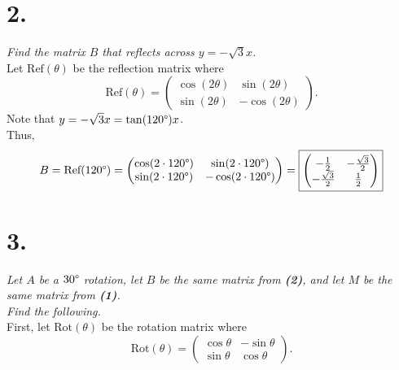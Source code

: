 \documentclass[12pt]{article}
\begin{document}
\section*{2.}
\textit{Find the matrix $B$ that reflects across $y = -\sqrt{3}x$.}
\\[\baselineskip]
Let $\text{Ref}(\theta)$ be the reflection matrix where
\begin{equation*}
	\text{Ref}(\theta) =
	\begin{pmatrix}
		\cos(2 \theta) & \sin(2 \theta) \\
		\sin(2 \theta) & -\cos(2 \theta)
	\end{pmatrix}
	.
\end{equation*}
Note that $y = -\sqrt{3}x = \tan(120 \degree)x$. \\
Thus,
\begin{equation*}
	B = \text{Ref}(120 \degree) =
	\begin{pmatrix}
		\cos(2 \cdot 120 \degree) & \sin(2 \cdot 120 \degree) \\
		\sin(2 \cdot 120 \degree) & -\cos(2 \cdot 120 \degree)
	\end{pmatrix}
	=
	\boxed{
		\begin{pmatrix}
			-\frac{1}{2} & -\frac{\sqrt{3}}{2} \\
			-\frac{\sqrt{3}}{2} & \frac{1}{2}
		\end{pmatrix}
	}
\end{equation*}

\section*{3.}
\textit{Let $A$ be a $30 \degree$ rotation, let $B$ be the same matrix
from \textbf{(2)}, and let $M$ be the same matrix from \textbf{(1)}. \\
Find the following.}
\\[\baselineskip]
First, let $\text{Rot}(\theta)$ be the rotation matrix where
\begin{equation*}
	\text{Rot}(\theta) =
	\begin{pmatrix}
		\cos \theta & -\sin \theta \\
		\sin \theta & \cos \theta
	\end{pmatrix}
	.
\end{equation*}
\end{document}
